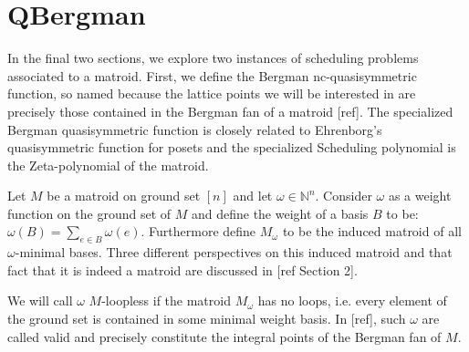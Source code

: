 \documentclass[12pt,reqno]{amsart}
\numberwithin{definition}{section}
\begin{document}
\section{QBergman}

In the final two sections, we explore two instances of scheduling
problems associated to a matroid.  First, we define the Bergman
nc-quasisymmetric function, so named because the lattice points we will be
interested in are precisely those contained in the Bergman fan of a
matroid [ref].  The specialized Bergman quasisymmetric function is
closely related to Ehrenborg's quasisymmetric function for posets and
the specialized Scheduling polynomial is the Zeta-polynomial of the
matroid.









Let $M$ be a matroid on ground set $[n]$ and let $\omega \in \mathbb{N}^n$.
Consider $\omega$ as a weight function on the ground set of $M$ and define the weight of a basis $B$ to be: $\omega(B) = \sum_{e\in B} \omega(e)$. 
Furthermore define $M_{\omega}$ to be the induced matroid of all
$\omega$-minimal bases.  Three different perspectives on this induced
matroid and that fact that it is indeed a matroid are discussed in [ref Section 2].

  We will call $\omega$ $M$-loopless if the matroid $M_{\omega}$ has
  no loops, i.e.  every element of the ground set is contained in
  some minimal weight basis.  In [ref], such $\omega$ are called 
    valid and precisely constitute the integral points of the Bergman
  fan of $M$.
\end{document}
